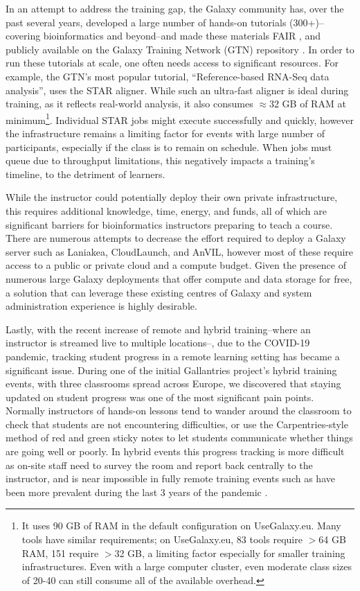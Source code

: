 \documentclass[a4paper,num-refs]{oup-contemporary}
\begin{document}
In an attempt to address the training gap, the Galaxy community has, over the past several years, developed a large number of hands-on tutorials (300+)--covering bioinformatics and beyond--and made these materials FAIR \cite{Wilkinson2016-zo,10.1371/journal.pcbi.1007854}, and publicly available on the Galaxy Training Network (GTN) repository \cite{training-site}. In order to run these tutorials at scale, one often needs access to significant resources. For example, the GTN's most popular tutorial, ``Reference-based RNA-Seq data analysis'', uses the STAR aligner\cite{Dobin2012}. While such an ultra-fast aligner is ideal during training, as it reflects real-world analysis, it also consumes $\approx$32 GB of RAM at minimum\footnote{It uses 90 GB of RAM in the default configuration on UseGalaxy.eu. Many tools have similar requirements; on UseGalaxy.eu, 83 tools require $>$64 GB RAM, 151 require $>$32 GB, a limiting factor especially for smaller training infrastructures. Even with a large computer cluster, even moderate class sizes of 20-40 can still consume all of the available overhead.}. Individual STAR jobs might execute successfully and quickly, however the infrastructure remains a limiting factor for events with large number of participants, especially if the class is to remain on schedule. When jobs must queue due to throughput limitations, this negatively impacts a training's timeline, to the detriment of learners.

While the instructor could potentially deploy their own private infrastructure, this requires additional knowledge, time, energy, and funds, all of which are significant barriers for bioinformatics instructors preparing to teach a course. There are numerous attempts to decrease the effort required to deploy a Galaxy server such as Laniakea\cite{Tangaro_2020}, CloudLaunch\cite{Afgan_2019}, and AnVIL\cite{Schatz_2022}, however most of these require access to a public or private cloud and a compute budget. Given the presence of numerous large Galaxy deployments that offer compute and data storage for free, a solution that can leverage these existing centres of Galaxy and system administration experience is highly desirable.

Lastly, with the recent increase of remote and hybrid training--where an instructor is streamed live to multiple locations--, due to the COVID-19 pandemic, tracking student progress in a remote learning setting has became a significant issue. During one of the initial Gallantries project's \cite{gallantries} hybrid training events, with three classrooms spread across Europe, we discovered that staying updated on student progress was one of the most significant pain points. Normally instructors of hands-on lessons tend to wander around the classroom to check that students are not encountering difficulties, or use the Carpentries-style \cite{thecarpentries,Wilson2016} method of red and green sticky notes to let students communicate whether things are going well or poorly. In hybrid events this progress tracking is more difficult as on-site staff need to survey the room and report back centrally to the instructor, and is near impossible in fully remote training events such as have been more prevalent during the last 3 years of the pandemic \cite{Serrano_Solano_2021}.
\end{document}
